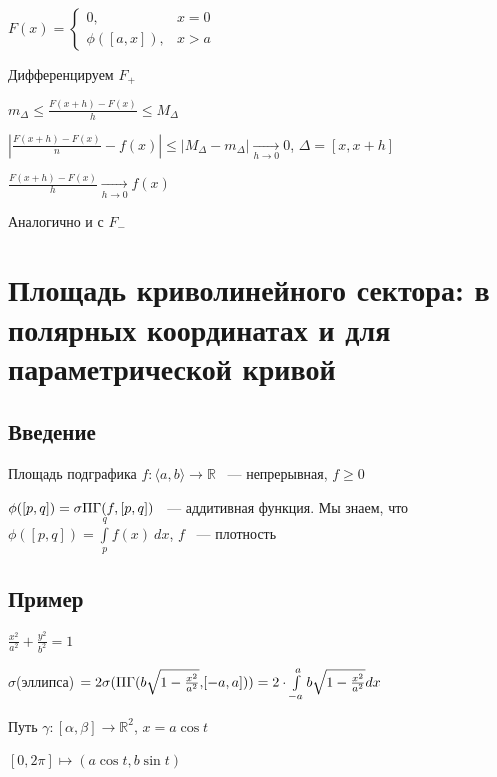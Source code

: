 \documentclass{article}
\begin{document}
            $F(x) = \begin{cases} 0, & x = 0 \\ \phi([a, x]), & x > a \end{cases}$
        
            Дифференцируем $F_+$
        
            $m_{\Delta} \leq \frac{F(x+ h) - F(x)}{h} \leq M_{\Delta}$
        
            $\left| \frac{F(x + h) - F(x)}{n} - f(x) \right| \leq \left| M_{\Delta} - m_{\Delta} \right| \xrightarrow[h \rightarrow 0]{} 0$, $\Delta = [x, x + h]$
        
            $\frac{F(x + h) - F(x)}{h} \xrightarrow[h \rightarrow 0]{} f(x)$
        
            Аналогично и с $F_-$
        
    \newpage
    
    \section{Площадь криволинейного сектора: в полярных координатах и для параметрической кривой}
    
        \subsection{Введение}
        
            Площадь подграфика $f : \langle a, b \rangle \rightarrow \mathbb{R}$ ~--- непрерывная, $f \geq 0$
        
            $\phi([p, q]) = \sigma \Pi\Gamma (f, [p, q])$ ~--- аддитивная функция. Мы знаем, что $\phi([p, q]) = \int\limits^q_p f(x) \ dx$, $f$ ~--- плотность

        \subsection{Пример}
        
            $\frac{x^2}{a^2} + \frac{y^2}{b^2} = 1$
            
            $\sigma$(эллипса) $ = 2 \sigma(\Pi\Gamma(b \sqrt{1 - \frac{x^2}{a^2}}{,} [-a, a])) =  2 \cdot \int\limits^a_{-a} b \sqrt{1 - \frac{x^2}{a^2}} dx$
            
            Путь $\gamma : [\alpha, \beta] \rightarrow \mathbb{R}^2$, $x = a \cos t$
            
            $[0, 2 \pi] \longmapsto (a \cos t, b \sin t)$
            
\end{document}
